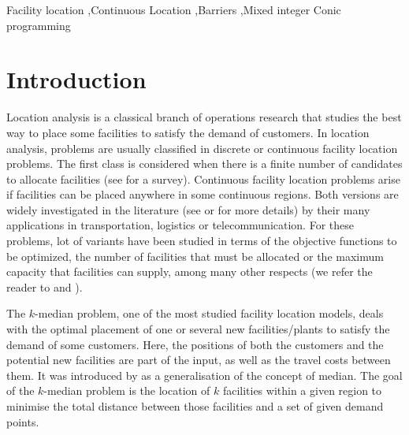 \documentclass[a4paper,  review, authoryear, 1p.]{elsarticle}
\newcommand{\JP}[1]{{\color{armygreen}#1}}
\begin{document}
\begin{frontmatter}
		\begin{keyword}
			Facility location \sep Continuous Location \sep Barriers \sep Mixed integer Conic programming 
		\end{keyword}
	\end{frontmatter}
	
	\section{Introduction}\label{section:introduction}

	Location analysis is a classical branch of operations research that studies the best way to place some facilities to satisfy the demand of customers. In location analysis, problems are usually classified in discrete or continuous facility location problems. The first class is considered when there is a finite number of candidates to allocate facilities (see \citet{ulukan2015} for a survey). Continuous facility location problems arise if facilities can be placed anywhere in some continuous regions. Both versions are widely investigated in the literature (see \citet{drezner2004} or \citet{nickel2007} for more details) by their many applications in transportation, logistics or telecommunication. For these problems, lot of variants have been studied in terms of the objective functions to be optimized, the number of facilities that must be allocated or the maximum capacity that facilities can supply, among many other respects (we refer the reader to \citet{kuehn1963} and \citet{puerto2008}).
	
	\JP{The $k$-median problem, one of the most studied facility location models, deals with the optimal placement of one or several new facilities/plants to satisfy the demand of some customers. Here, the positions of both the customers and the potential new facilities are part of the input, as well as the travel costs between them. It was introduced by \cite{hakimi1965} as a generalisation of the concept of median. The goal of the $k$-median problem is  the location of $k$ facilities within a given region to minimise the total distance between those facilities and a set of given demand points.}
	
\end{document}
